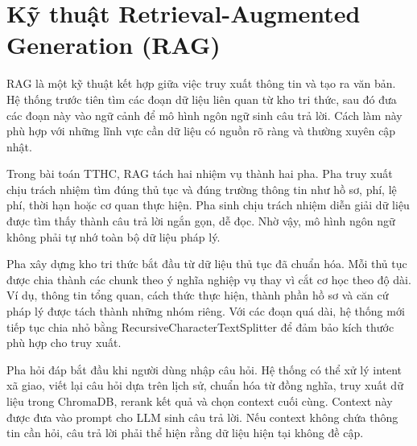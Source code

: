 \section{Kỹ thuật Retrieval-Augmented
Generation
(RAG)}

RAG là một kỹ thuật kết hợp giữa việc truy xuất thông tin và tạo ra văn
bản. Hệ thống trước tiên tìm các đoạn dữ liệu liên quan từ kho tri thức,
sau đó đưa các đoạn này vào ngữ cảnh để mô hình ngôn ngữ sinh câu trả
lời. Cách làm này phù hợp với những lĩnh vực cần dữ liệu có nguồn rõ
ràng và thường xuyên cập nhật.

Trong bài toán TTHC, RAG tách hai nhiệm vụ thành hai pha. Pha truy xuất
chịu trách nhiệm tìm đúng thủ tục và đúng trường thông tin như hồ sơ,
phí, lệ phí, thời hạn hoặc cơ quan thực hiện. Pha sinh chịu trách nhiệm
diễn giải dữ liệu được tìm thấy thành câu trả lời ngắn gọn, dễ đọc. Nhờ
vậy, mô hình ngôn ngữ không phải tự nhớ toàn bộ dữ liệu pháp lý.

Pha xây dựng kho tri thức bắt đầu từ dữ liệu thủ tục đã chuẩn hóa. Mỗi
thủ tục được chia thành các chunk theo ý nghĩa nghiệp vụ thay vì cắt cơ
học theo độ dài. Ví dụ, thông tin tổng quan, cách thức thực hiện, thành
phần hồ sơ và căn cứ pháp lý được tách thành những nhóm riêng. Với các
đoạn quá dài, hệ thống mới tiếp tục chia nhỏ bằng
RecursiveCharacterTextSplitter để đảm bảo kích thước phù hợp cho truy
xuất.

Pha hỏi đáp bắt đầu khi người dùng nhập câu hỏi. Hệ thống có thể xử lý
intent xã giao, viết lại câu hỏi dựa trên lịch sử, chuẩn hóa từ đồng
nghĩa, truy xuất dữ liệu trong ChromaDB, rerank kết quả và chọn context
cuối cùng. Context này được đưa vào prompt cho LLM sinh câu trả lời. Nếu
context không chứa thông tin cần hỏi, câu trả lời phải thể hiện rằng dữ
liệu hiện tại không đề cập.

